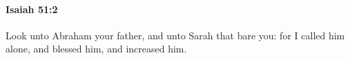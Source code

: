 
		\paragraph{Isaiah 51:2} %
			\label{ISAIAH-51-2}

			Look unto Abraham your father, and unto Sarah that bare you: for I called him alone, and blessed him, and increased him.


